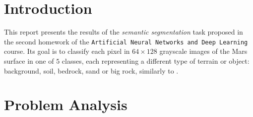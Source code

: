 \documentclass[11pt]{article}
\begin{document}
\begin{multicols}{2}

      \section{Introduction}


      This report presents the results of the \textit{semantic segmentation}\cite{long2015fullyconvolutionalnetworkssemantic}
      task proposed in the second homework of the \texttt{Artificial Neural Networks and Deep Learning} course. Its goal is to classify each pixel in $64\times128$ grayscale images of the Mars surface in one of $5$ classes, each representing a different type of terrain or object: background, soil, bedrock, sand or big rock, similarly to \cite{li2024marssegmarssurfacesemantic}.

      \section{Problem Analysis}
      \label{sec:analysis}


\end{multicols}
\end{document}
